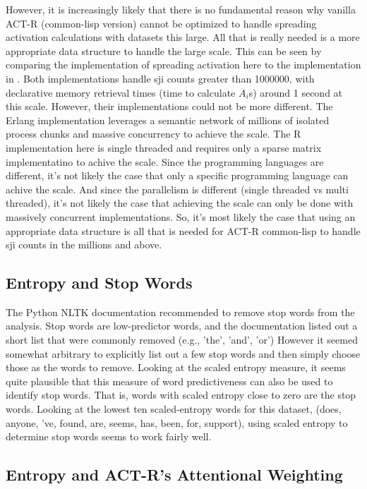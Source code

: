 \documentclass[10pt,letterpaper]{article}
\begin{document}
However, it is increasingly likely that there is no fundamental reason why vanilla ACT-R (common-lisp version) cannot be optimized to handle spreading activation calculations with datasets this large.
All that is really needed is a more appropriate data structure to handle the large scale.
This can be seen by comparing the implementation of spreading activation here to the implementation in .
Both implementations handle sji counts greater than \num{1000000}, with declarative memory retrieval times (time to calculate $A_i$s) around 1 second at this scale.
However, their implementations could not be more different.
The Erlang implementation leverages a semantic network of millions of isolated process chunks and massive concurrency to achieve the scale.
The R implementation here is single threaded and requires only a sparse matrix implementatino to achive the scale.
Since the programming languages are different, it's not likely the case that only a specific programming language can achive the scale.
And since the parallelism is different (single threaded vs multi threaded), it's not likely the case that achieving the scale can only be done with massively concurrent implementations.
So, it's most likely the case that using an appropriate data structure is all that is needed for ACT-R common-lisp to handle sji counts in the millions and above.

\subsection{Entropy and Stop Words}

The Python NLTK documentation \cite{Bird2009} recommended to remove stop words from the analysis.
Stop words are low-predictor words, and the documentation listed out a short list that were commonly removed (e.g., 'the', 'and', 'or')
However it seemed somewhat arbitrary to explicitly list out a few stop words and then simply choose those as the words to remove.
Looking at the scaled entropy measure, it seems quite plausible that this measure of word predictiveness can also be used to identify stop words.
That is, words with scaled entropy close to zero are the stop words.
Looking at the lowest ten scaled-entropy words for this dataset, (does, anyone, 've, found, are, seems, has, been, for, support), using scaled entropy to determine stop words seems to work fairly well.

\subsection{Entropy and ACT-R's Attentional Weighting}
\end{document}
